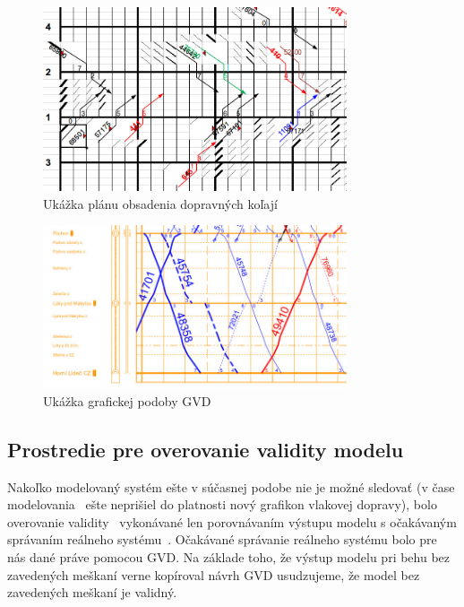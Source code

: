 \documentclass[12pt,a4paper,titlepage,final]{article}
\begin{document}
\begin{figure}[h]
	\centering
	\includegraphics[width=0.8\textwidth]{img/pok}
	\caption{Ukážka plánu obsadenia dopravných koľají} \label{fig:pok_example}
\end{figure}

\begin{figure}
	\centering
	\includegraphics[width=0.8\textwidth]{img/gvd}
	\caption{Ukážka grafickej podoby GVD} \label{fig:gvd_example}
\end{figure}


\subsection{Prostredie pre overovanie validity modelu}

Nakoľko modelovaný systém ešte v súčasnej podobe nie je možné sledovať (v čase modelovania~\cite[str.\,6]{opora} ešte neprišiel do platnosti nový grafikon vlakovej dopravy), bolo overovanie validity~\cite[str.\,15]{opora} vykonávané len porovnávaním výstupu modelu s očakávaným správaním reálneho systému~\cite[str.\,6]{opora}.
Očakávané správanie reálneho systému bolo pre nás dané práve pomocou GVD.
Na základe toho, že výstup modelu pri behu bez zavedených meškaní verne kopíroval návrh GVD
usudzujeme, že model bez zavedených meškaní je validný.
\end{document}

